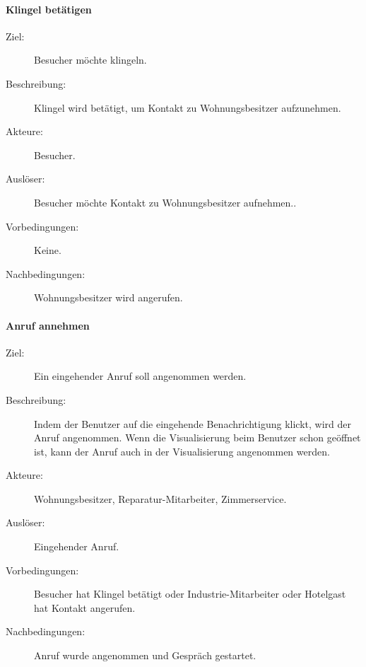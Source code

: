 \paragraph{\large{Klingel betätigen}}
    \begin{description}
        \item[Ziel:] Besucher möchte klingeln.
        \item[Beschreibung:] Klingel wird betätigt, um Kontakt zu Wohnungsbesitzer aufzunehmen.
        \item[Akteure:] Besucher.
        \item[Auslöser:] Besucher möchte Kontakt zu Wohnungsbesitzer aufnehmen..
        \item[Vorbedingungen:] Keine.
        \item[Nachbedingungen:] Wohnungsbesitzer wird angerufen.
    \end{description}

\paragraph{\large{Anruf annehmen}}
    \begin{description}
        \item[Ziel:] Ein eingehender Anruf soll angenommen werden.
        \item[Beschreibung:] Indem der Benutzer auf die eingehende Benachrichtigung klickt, wird der Anruf angenommen.
            Wenn die Visualisierung beim Benutzer schon geöffnet ist, kann der Anruf auch in der Visualisierung angenommen werden.
        \item[Akteure:] Wohnungsbesitzer, Reparatur-Mitarbeiter, Zimmerservice.
        \item[Auslöser:] Eingehender Anruf.
        \item[Vorbedingungen:] Besucher hat Klingel betätigt oder Industrie-Mitarbeiter oder Hotelgast hat Kontakt angerufen.
        \item[Nachbedingungen:] Anruf wurde angenommen und Gespräch gestartet.
    \end{description}


